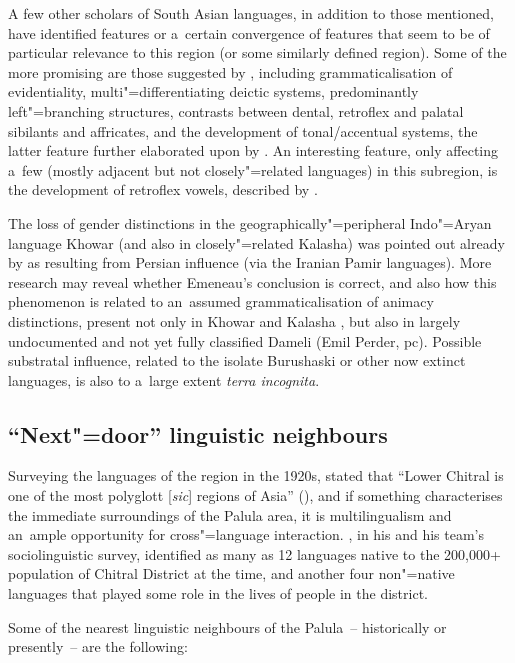 A few other scholars of South Asian languages, in addition to those mentioned, have identified features or a~certain convergence of features that seem to be of particular relevance to this region (or some similarly defined region). Some of the more promising are those suggested by \citet{bashir2003}, including grammaticalisation of evidentiality, multi"=differentiating deictic systems, predominantly left"=branching structures, contrasts between dental, retroflex and palatal sibilants and affricates, and the development of tonal/accentual systems, the latter feature further elaborated upon by \citet[132--144]{baart2003}. An interesting feature, only affecting a~few (mostly adjacent but not closely"=related languages) in this subregion, is the development of retroflex vowels, described by \citet{morch1997}. 


The loss of gender distinctions in the geographically"=peripheral Indo"=Aryan language Khowar (and also in closely"=related Kalasha) was pointed out already by \citet{emeneau1965} as resulting from Persian influence (via the Iranian Pamir languages). More research may reveal whether Emeneau's conclusion is correct, and also how this phenomenon is related to an~assumed grammaticalisation of animacy distinctions, present not only in Khowar and Kalasha \citep[401]{bashir1988}, but also in largely undocumented and not yet fully classified Dameli (Emil Perder, pc). Possible substratal influence, related to the isolate Burushaski or other now extinct languages, is also to a~large extent \textit{terra incognita}.


\subsection{``Next"=door'' linguistic neighbours}
\label{subsec:1-3-3}

Surveying the languages of the region in the 1920s, \citeauthor{morgenstierne1941} stated that ``Lower Chitral is one of the most polyglott [\textit{sic}] regions of Asia'' (\citeyear[7]{morgenstierne1941}), and if something characterises the immediate surroundings of the Palula area, it is multilingualism and an~ample opportunity for cross"=language interaction. \citet[10--23]{decker1992a}, in his and his team's sociolinguistic survey, identified as many as 12 languages native to the 200,000+ population of Chitral District at the time, and another four non"=native languages that played some role in the lives of people in the district. 


Some of the nearest linguistic neighbours of the Palula~-- historically or presently~-- are the following:


